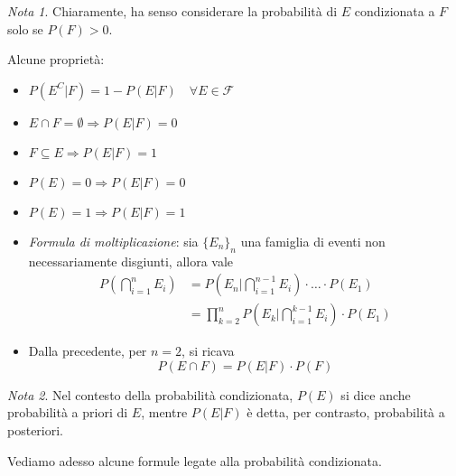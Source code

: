 \documentclass{article}
\theoremstyle{plain}
\theoremstyle{definition}
\theoremstyle{remark}
\newtheorem*{nota}{Nota}
\begin{document}
\begin{nota}
	Chiaramente, ha senso considerare la probabilità di $E$ condizionata a $F$ solo se $P(F)>0$.
\end{nota}
Alcune proprietà:
\begin{itemize}
	\item $P(E^C|F)=1-P(E|F)\quad\forall E\in\mathcal{F}$
	\item $E\cap F=\emptyset \Rightarrow P(E|F)=0$
	\item $F\subseteq E \Rightarrow P(E|F)=1$
	\item $P(E)=0 \Rightarrow P(E|F)=0$
	\item $P(E)=1 \Rightarrow P(E|F)=1$
	\item \textit{Formula di moltiplicazione}: sia $\{E_n\}_n$ una famiglia di eventi non necessariamente disgiunti, allora vale
	\begin{align*}
		P\left(\bigcap_{i=1}^n E_i\right)&=P\left(E_n|\bigcap_{i=1}^{n-1} E_i\right)\cdot\ldots\cdot P(E_1)\\
		&=\prod_{k=2}^n P\left(E_k|\bigcap_{i=1}^{k-1} E_i\right)\cdot P(E_1)
	\end{align*}
	\item Dalla precedente, per $n=2$, si ricava
	\begin{equation*}
		P(E\cap F)=P(E|F)\cdot P(F)
	\end{equation*}
\end{itemize}
\begin{nota}
	Nel contesto della probabilità condizionata, $P(E)$ si dice anche probabilità a priori di $E$, mentre $P(E|F)$ è detta, per contrasto, probabilità a posteriori.
\end{nota}
Vediamo adesso alcune formule legate alla probabilità condizionata.
\end{document}
